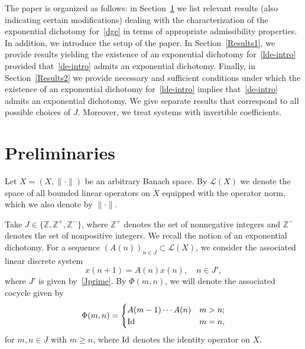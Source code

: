 \documentclass[11pt,reqno,a4paper]{amsart}
\theoremstyle{plain}
\numberwithin{equation}{section}
\theoremstyle{remark}
\def\Id{\text{\rm Id}}
\def\Z{\mathbb{Z}}
\begin{document}
The paper is organized as follows: in Section~\ref{Preliminaries} we list relevant results (also indicating certain modifications) dealing with the characterization of the exponential dichotomy for~\eqref{dge} in terms of appropriate admissibility properties. In addition, we introduce the setup of the paper.
In Section~\ref{Results1}, we provide results yielding the existence of an exponential dichotomy for~\eqref{lde-intro} provided that~\eqref{de-intro} admits an exponential dichotomy.  Finally, in Section~\ref{Results2} we provide necessary and sufficient conditions under which the existence of an exponential dichotomy for~\eqref{lde-intro} implies that~\eqref{de-intro} admits an exponential dichotomy. We give separate results that correspond to all possible choices of $J$. Moreover, we treat systems with invertible coefficients. 




 


\section{Preliminaries}\label{Preliminaries}
Let $X=(X, \|\cdot \|)$ be an arbitrary Banach space. 
By $\mathcal L(X)$ we denote the space of all bounded linear operators on $X$ equipped with the operator norm, which we also denote by $\|\cdot \|$.

Take $J\in \{\Z, \Z^+, \Z^-\}$, where $\Z^+$ denotes the set of nonnegative integers and $\Z^-$ denotes the set of nonpositive integers. We recall the notion of an exponential dichotomy.
For a sequence $(A(n))_{n\in J}\subset \mathcal L(X)$, we consider the associated linear discrete system
\begin{equation}\label{lde-f}
    x(n+1)=A(n)x(n), \quad n\in J',
\end{equation}
where  $J'$ is given by~\eqref{Jprime}.
By $\Phi(m,n)$, we will denote the associated cocycle given by 
\[
\Phi(m, n)=\begin{cases}
A(m-1)\cdots A(n) & m>n;\\
\Id & m=n,
\end{cases}
\]
for $m, n\in J$ with $m\ge n$, where $\Id$ denotes the identity operator on $X$.
\end{document}
